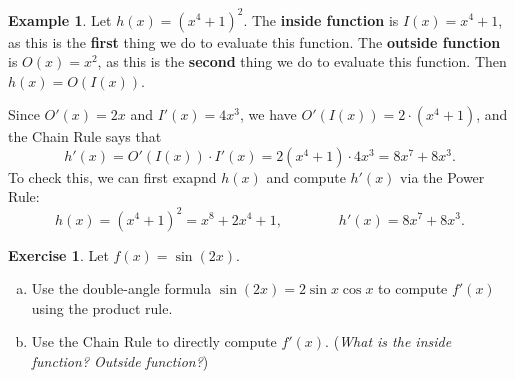\documentclass[11pt,reqno,final]{amsart}
\numberwithin{figure}{section}
\theoremstyle{definition} %
\newtheorem{example}[equation]{Example}%
\newtheorem{exercise}[question]{Exercise}
\begin{document}
\begin{example}
        Let $h(x) = (x^4+1)^2$.
        The \textbf{inside function} is $I(x) = x^4+1$, as this is the \textbf{first} thing we do to evaluate this function.
        The \textbf{outside function} is $O(x) = x^2$, as this is the \textbf{second} thing we do to evaluate this function.
        Then $h(x) = O(I(x))$.

        Since $O'(x) = 2x$ and $I'(x) = 4x^3$, we have $O'(I(x)) = 2\cdot (x^4+1)$, and the Chain Rule says that
        \[
                h'(x) = O'(I(x)) \cdot I'(x) = 2(x^4+1) \cdot 4x^3 = 8x^7+8x^3.
        \]
        To check this, we can first exapnd $h(x)$ and compute $h'(x)$ via the Power Rule:
        \[
                h(x) = (x^4+1)^2 = x^8 + 2x^4+1,
                \qquad \qquad
                h'(x) = 8x^7 + 8x^3.
        \]
\end{example}


\begin{exercise}
        Let $f(x) = \sin(2x)$.
        \begin{enumerate}[(a)]
        \item Use the double-angle formula $\sin(2x) = 2 \sin x \cos x$ to compute $f'(x)$ using the product rule.
                \vfill
        \item Use the Chain Rule to directly compute $f'(x)$.
                (\textit{What is the inside function? Outside function?})
                \vfill
        \end{enumerate}          
\end{exercise}

\newpage
\end{document}
